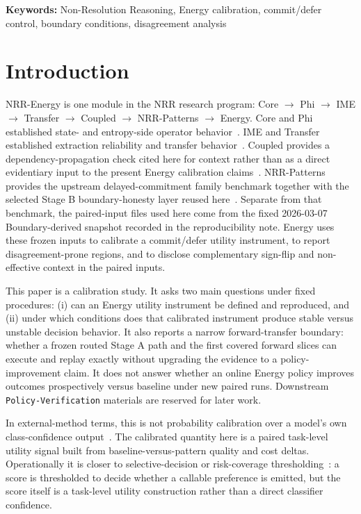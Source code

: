 \documentclass[11pt,a4paper]{article}
\begin{document}
\noindent\textbf{Keywords:} Non-Resolution Reasoning, Energy calibration, commit/defer control, boundary conditions, disagreement analysis

\section{Introduction}
\label{sec:intro}

NRR-Energy is one module in the NRR research program:
Core $\rightarrow$ Phi $\rightarrow$ IME $\rightarrow$ Transfer $\rightarrow$ Coupled $\rightarrow$ NRR-Patterns $\rightarrow$ Energy.
Core and Phi established state- and entropy-side operator behavior~\cite{saito2025nrr,saito2026phi}. IME and Transfer established extraction reliability and transfer behavior~\cite{saito2026ime,saito2026transfer}. Coupled provides a dependency-propagation check cited here for context rather than as a direct evidentiary input to the present Energy calibration claims~\cite{saito2026coupled}. NRR-Patterns provides the upstream delayed-commitment family benchmark together with the selected Stage B boundary-honesty layer reused here~\cite{saito2026principles}. Separate from that benchmark, the paired-input files used here come from the fixed 2026-03-07 Boundary-derived snapshot recorded in the reproducibility note. Energy uses these frozen inputs to calibrate a commit/defer utility instrument, to report disagreement-prone regions, and to disclose complementary sign-flip and non-effective context in the paired inputs.

This paper is a calibration study. It asks two main questions under fixed
procedures: (i) can an Energy utility instrument be defined and reproduced, and
(ii) under which conditions does that calibrated instrument produce stable
versus unstable decision behavior. It also reports a narrow forward-transfer
boundary: whether a frozen routed Stage A path and the first covered forward
slices can execute and replay exactly without upgrading the evidence to a
policy-improvement claim. It does not answer whether an online Energy policy
improves outcomes prospectively versus baseline under new paired runs.
Downstream \texttt{Policy-Verification} materials are reserved for later work.

In external-method terms, this is not probability calibration over a model's own
class-confidence output~\cite{guo2017calibration}. The calibrated quantity here
is a paired task-level utility signal built from baseline-versus-pattern quality
and cost deltas. Operationally it is closer to selective-decision or
risk-coverage thresholding~\cite{geifman2017selective}: a score is thresholded
to decide whether a callable preference is emitted, but the score itself is a
task-level utility construction rather than a direct classifier confidence.
\end{document}
